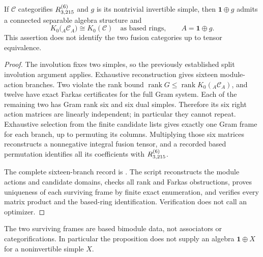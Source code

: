 \begin{proposition}
\label{prop:first-residual-morita-self-ring}
If $\mathcal C$ categorifies $R^{(6)}_{3,215}$ and $g$ is its nontrivial
invertible simple, then $\mathbf1\oplus g$ admits a connected separable
algebra structure and
\[
 K_0\bigl({}_A\mathcal C_A\bigr)\cong K_0(\mathcal C)
 \quad\text{as based rings},\qquad A=\mathbf1\oplus g.
\]
This assertion does not identify the two fusion categories up to tensor
equivalence.
\end{proposition}
\begin{proof}
The involution fixes two simples, so the previously established split
involution argument applies. Exhaustive reconstruction gives sixteen
module-action branches. Two violate the rank bound
$\operatorname{rank}G\leq\operatorname{rank}K_0({}_A\mathcal C_A)$,
and twelve have exact Farkas certificates for the full Gram system.
Each of the remaining two has Gram rank six and six dual simples.
Therefore its six right action matrices are linearly independent; in
particular they cannot repeat. Exhaustive selection from the finite
candidate lists gives exactly one Gram frame for each branch, up to
permuting its columns. Multiplying those six matrices reconstructs a
nonnegative integral fusion tensor, and a recorded based permutation
identifies all its coefficients with $R^{(6)}_{3,215}$.

The complete sixteen-branch record is
.
The script
reconstructs the module actions and candidate domains, checks all rank
and Farkas obstructions, proves uniqueness of each surviving frame by
finite exact enumeration, and verifies every matrix product and the
based-ring identification. Verification does not call an optimizer.
\end{proof}

The two surviving frames are based bimodule data, not associators or
categorifications. In particular the proposition does not supply an
algebra $\mathbf1\oplus X$ for a noninvertible simple $X$.
